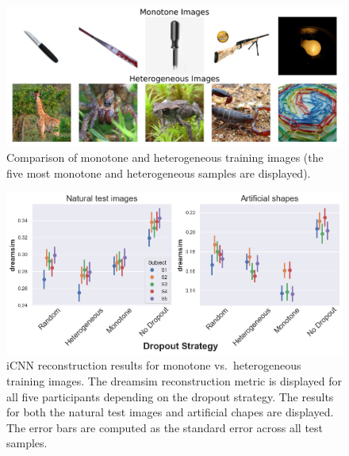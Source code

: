 \begin{figure}[ht]
  \centering
  \includegraphics[width=1\textwidth]{plots/dropout_discussion_monohetero_qual.jpeg}
  \caption[Monotone and heterogeneous samples in the training dataset]{Comparison of monotone and heterogeneous training images (the five most monotone and heterogeneous samples are displayed).}\label{fig:dropout_discussion_monohetero_qual}
\end{figure}

\begin{figure}[ht]
  \centering
  \includegraphics[width=1\textwidth]{plots/dropout_discussion_reconstruction_icnn.png}
  \caption[iCNN reconstruction performance monotone vs.\ heterogeneous training sample]{iCNN reconstruction results for monotone vs.\ heterogeneous training images. The dreamsim reconstruction metric is displayed for all five participants depending on the dropout strategy. The results for both the natural test images and artificial chapes are displayed. The error bars are computed as the standard error across all test samples.}\label{fig:dropout_discussion_reconstruction_icnn}
\end{figure}

